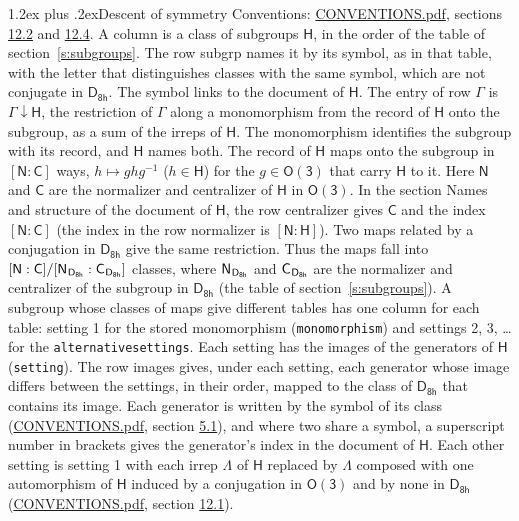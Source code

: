 \documentclass[10pt,a4paper]{article}
\makeatletter
\renewcommand\section{\@startsection{section}{1}{\z@}{-3ex plus -1ex minus -.2ex}%
  {1.2ex plus .2ex}{\normalfont\large\sffamily\bfseries\color{parttitle}}}
\numberwithin{equation}{section}
\newcommand{\grp}[1]{\mathsf{#1}}
\newcommand{\grpindex}[2]{[#1 : #2]}
\newcommand{\restr}[2]{#1\!\downarrow#2}
\newcommand{\hairsp}{\mkern1mu}
\makeatother
\begin{document}
\section{Descent of symmetry}\label{s:subduction}
Conventions: \href{../../CONVENTIONS.pdf}{CONVENTIONS.pdf}, sections \href{../../CONVENTIONS.pdf\#conv.12.2}{12.2} and \href{../../CONVENTIONS.pdf\#conv.12.4}{12.4}.
A column is a class of subgroups $\grp{H}$, in the order of the table of section~\ref{s:subgroups}. The row subgrp names it by its symbol, as in that table, with the letter that distinguishes classes with the same symbol, which are not conjugate in $\grp{D_{8h}}$. The symbol links to the document of $\grp{H}$. The entry of row $\Gamma$ is $\restr{\Gamma}{\grp{H}}$, the restriction of $\Gamma$ along a monomorphism from the record of $\grp{H}$ onto the subgroup, as a sum of the irreps of $\grp{H}$. The monomorphism identifies the subgroup with its record, and $\grp{H}$ names both. \label{n:group.normalizer.o3}\label{n:group.centralizer.o3}The record of $\grp{H}$ maps onto the subgroup in $\grpindex{\grp{N}}{\grp{C}}$ ways, $h \mapsto g h g^{-1}$ ($h \in \grp{H}$) for the $g \in \grp{O(3)}$ that carry $\grp{H}$ to it. Here $\grp{N}$ and $\grp{C}$ are the normalizer and centralizer of $\grp{H}$ in \href{O3.pdf}{$\grp{O(3)}$}. In the section Names and structure of the document of $\grp{H}$, the row centralizer gives $\grp{C}$ and the index $\grpindex{\grp{N}}{\grp{C}}$ (the index in the row normalizer is $\grpindex{\grp{N}}{\grp{H}}$). Two maps related by a conjugation in $\grp{D_{8h}}$ give the same restriction. Thus the maps fall into $\grpindex{\grp{N}}{\grp{C}}/\grpindex{\grp{N}_{\hairsp \grp{D_{8h}}}}{\grp{C}_{\hairsp \grp{D_{8h}}}}$ classes, where $\grp{N}_{\hairsp \grp{D_{8h}}}$ and $\grp{C}_{\hairsp \grp{D_{8h}}}$ are the normalizer and centralizer of the subgroup in $\grp{D_{8h}}$ (the table of section~\ref{s:subgroups}). \label{n:head.setting}A subgroup whose classes of maps give different tables has one column for each table: setting 1 for the stored monomorphism (\texttt{monomorphism}) and settings 2, 3, \dots{} for the \texttt{alternativesettings}. Each setting has the images of the generators of $\grp{H}$ (\texttt{setting}). \label{n:head.images}The row images gives, under each setting, each generator whose image differs between the settings, in their order, mapped to the class of $\grp{D_{8h}}$ that contains its image. \label{n:element.generator.index}Each generator is written by the symbol of its class (\href{../../CONVENTIONS.pdf}{CONVENTIONS.pdf}, section \href{../../CONVENTIONS.pdf\#conv.5.1}{5.1}), and where two share a symbol, a superscript number in brackets gives the generator's index in the document of $\grp{H}$. \label{n:irrep.Delta}Each other setting is setting 1 with each irrep $\Lambda$ of $\grp{H}$ replaced by $\Lambda$ composed with one automorphism of $\grp{H}$ induced by a conjugation in \href{O3.pdf}{$\grp{O(3)}$} and by none in $\grp{D_{8h}}$ (\href{../../CONVENTIONS.pdf}{CONVENTIONS.pdf}, section \href{../../CONVENTIONS.pdf\#conv.12.1}{12.1}).
\end{document}
